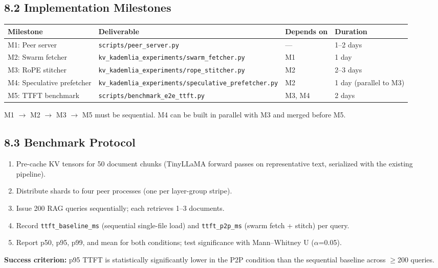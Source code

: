 \documentclass[11pt]{article}
\providecommand{\tightlist}{%
  \setlength{\itemsep}{0pt}\setlength{\parskip}{0pt}}
\begin{document}
\subsection{8.2 Implementation Milestones}

\begin{longtable}[]{@{}llll@{}}
\toprule
Milestone & Deliverable & Depends on & Duration \\
\midrule
\endhead
\bottomrule
\endlastfoot
M1: Peer server & \texttt{scripts/peer\_server.py} & --- & 1--2 days \\
M2: Swarm fetcher & \texttt{kv\_kademlia\_experiments/swarm\_fetcher.py} & M1 & 1 day \\
M3: RoPE stitcher & \texttt{kv\_kademlia\_experiments/rope\_stitcher.py} & M2 & 2--3 days \\
M4: Speculative prefetcher & \texttt{kv\_kademlia\_experiments/speculative\_prefetcher.py} & M2 & 1 day (parallel to M3) \\
M5: TTFT benchmark & \texttt{scripts/benchmark\_e2e\_ttft.py} & M3, M4 & 2 days \\
\end{longtable}

M1 $\to$ M2 $\to$ M3 $\to$ M5 must be sequential. M4 can be built in
parallel with M3 and merged before M5.

\subsection{8.3 Benchmark Protocol}

\begin{enumerate}
\tightlist
\item Pre-cache KV tensors for 50 document chunks (TinyLLaMA forward passes
  on representative text, serialized with the existing pipeline).
\item Distribute shards to four peer processes (one per layer-group stripe).
\item Issue 200 RAG queries sequentially; each retrieves 1--3 documents.
\item Record \texttt{ttft\_baseline\_ms} (sequential single-file load) and
  \texttt{ttft\_p2p\_ms} (swarm fetch + stitch) per query.
\item Report p50, p95, p99, and mean for both conditions; test significance
  with Mann--Whitney U ($\alpha$=0.05).
\end{enumerate}

\textbf{Success criterion:} p95 TTFT is statistically significantly
lower in the P2P condition than the sequential baseline across
$\geq$200 queries.
\end{document}
